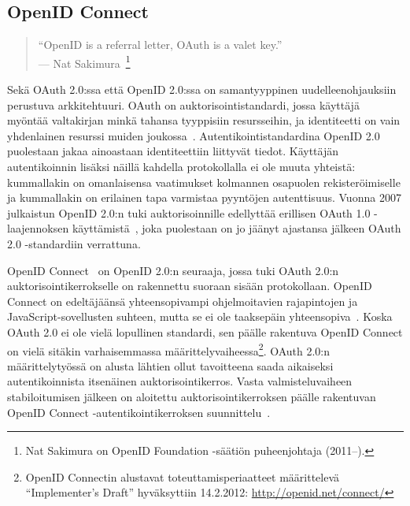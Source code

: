 \documentclass[finnish,gradu]{tktltiki}
\begin{document}


  \subsection{OpenID Connect} %
  \label{sub:openid_connect}

  \begin{quote}
    ``OpenID is a referral letter, OAuth is a valet key.''
    \\--- Nat Sakimura~\cite{sakimura_dummydiff_oauth_openid_2011}\footnote{Nat Sakimura on OpenID Foundation -säätiön puheenjohtaja (2011--).}
  \end{quote}

  Sekä OAuth 2.0:ssa että OpenID 2.0:ssa on samantyyppinen uudelleenohjauksiin perustuva arkkitehtuuri. OAuth on auktorisointistandardi, jossa käyttäjä myöntää valtakirjan minkä tahansa tyyppisiin resursseihin, ja identiteetti on vain yhdenlainen resurssi muiden joukossa~\cite{sakimura_dummydiff_oauth_openid_2011}. Autentikointistandardina OpenID 2.0 puolestaan jakaa ainoastaan identiteettiin liittyvät tiedot. Käyttäjän autentikoinnin lisäksi näillä kahdella protokollalla ei ole muuta yhteistä: kummallakin on omanlaisensa vaatimukset kolmannen osapuolen rekisteröimiselle ja kummallakin on erilainen tapa varmistaa pyyntöjen autenttisuus. Vuonna 2007 julkaistun OpenID 2.0:n tuki auktorisoinnille edellyttää erillisen OAuth 1.0 -laajennoksen käyttämistä~\cite{openid_2.0_oauth_hybrid_2009}, joka puolestaan on jo jäänyt ajastansa jälkeen OAuth 2.0 -standardiin verrattuna.

  OpenID Connect~\cite{openid_connect_specification_2012} on OpenID 2.0:n seuraaja, jossa tuki OAuth 2.0:n auktorisointikerrokselle on rakennettu suoraan sisään protokollaan. OpenID Connect on edeltäjäänsä yhteensopivampi ohjelmoitavien rajapintojen ja JavaScript-sovellusten suhteen, mutta se ei ole taaksepäin yhteensopiva~\cite{sakimura_openid_connect_scopes_2011}. Koska OAuth 2.0 ei ole vielä lopullinen standardi, sen päälle rakentuva OpenID Connect on vielä sitäkin varhaisemmassa määrittelyvaiheessa\footnote{
  OpenID Connectin alustavat toteuttamisperiaatteet määrittelevä ``Implementer's Draft'' hyväksyttiin 14.2.2012: \url{http://openid.net/connect/}
  }. OAuth 2.0:n määrittelytyössä on alusta lähtien ollut tavoitteena saada aikaiseksi autentikoinnista itsenäinen auktorisointikerros. Vasta valmisteluvaiheen stabiloitumisen jälkeen on aloitettu auktorisointikerroksen päälle rakentuvan OpenID Connect -autentikointikerroksen suunnittelu~\cite{recordon_oauth20_initial_2010, shepard_oauth_facebook_2010}.
\end{document}
